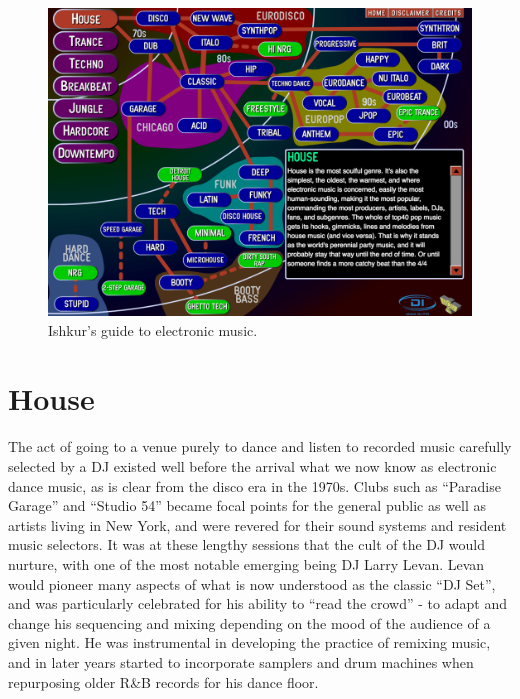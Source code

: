 \begin{figure}
	\begin{center}
		\includegraphics[width=\figSizeHundred]{ch02_dancemusic/figures/ishkur.png}
	\end{center}
	\caption[Ishkur's guide to electronic music.]{Ishkur's guide to electronic music.}
	\label{fig:ishkur}
\end{figure}

\section{House}

The act of going to a venue purely to dance and listen to recorded music carefully selected by a DJ existed well before the arrival what we now know as electronic dance music, as is clear from the disco era in the 1970s. Clubs such as “Paradise Garage” and “Studio 54” became focal points for the general public as well as artists living in New York, and were revered for their sound systems and resident music selectors. It was at these lengthy sessions that the cult of the DJ would nurture, with one of the most notable emerging being DJ Larry Levan. Levan would pioneer many aspects of what is now understood as the classic “DJ Set”, and was particularly celebrated for his ability to “read the crowd” - to adapt and change his sequencing and mixing depending on the mood of the audience of a given night. He was instrumental in developing the practice of remixing music, and in later years started to incorporate samplers and drum machines when repurposing older R\&B records for his dance floor.

